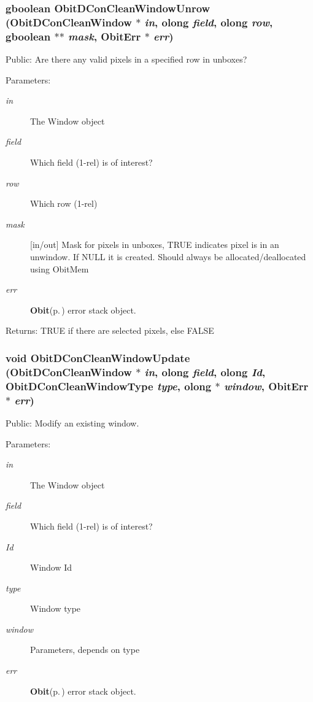 \subsubsection{\setlength{\rightskip}{0pt plus 5cm}gboolean Obit\-DCon\-Clean\-Window\-Unrow ({\bf Obit\-DCon\-Clean\-Window} $\ast$ {\em in}, {\bf olong} {\em field}, {\bf olong} {\em row}, gboolean $\ast$$\ast$ {\em mask}, {\bf Obit\-Err} $\ast$ {\em err})}\label{ObitDConCleanWindow_8c_a26}


Public: Are there any valid pixels in a specified row in unboxes? 

\begin{Desc}
\item[Parameters:]
\begin{description}
\item[{\em in}]The Window object \item[{\em field}]Which field (1-rel) is of interest? \item[{\em row}]Which row (1-rel) \item[{\em mask}][in/out] Mask for pixels in unboxes, TRUE indicates pixel is in an unwindow. If NULL it is created. Should always be allocated/deallocated using Obit\-Mem \item[{\em err}]{\bf Obit}{\rm (p.\,\pageref{structObit})} error stack object. \end{description}
\end{Desc}
\begin{Desc}
\item[Returns:]TRUE if there are selected pixels, else FALSE \end{Desc}
\subsubsection{\setlength{\rightskip}{0pt plus 5cm}void Obit\-DCon\-Clean\-Window\-Update ({\bf Obit\-DCon\-Clean\-Window} $\ast$ {\em in}, {\bf olong} {\em field}, {\bf olong} {\em Id}, {\bf Obit\-DCon\-Clean\-Window\-Type} {\em type}, {\bf olong} $\ast$ {\em window}, {\bf Obit\-Err} $\ast$ {\em err})}\label{ObitDConCleanWindow_8c_a21}


Public: Modify an existing window. 

\begin{Desc}
\item[Parameters:]
\begin{description}
\item[{\em in}]The Window object \item[{\em field}]Which field (1-rel) is of interest? \item[{\em Id}]Window Id \item[{\em type}]Window type \item[{\em window}]Parameters, depends on type \item[{\em err}]{\bf Obit}{\rm (p.\,\pageref{structObit})} error stack object. \end{description}
\end{Desc}
